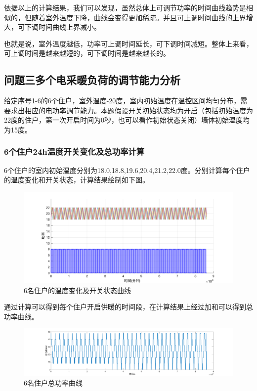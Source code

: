 \documentclass[withoutpreface,bwprint]{cumcmthesis} %
\begin{document}
依据以上的计算结果，我们可以发现，虽然总体上可调节功率的时间曲线趋势是相似的，但随着室外温度下降，曲线会变得更加稀疏。并且可上调时间曲线的上界增大，可下调时间曲线上界减小。

也就是说，室外温度越低，功率可上调时间延长，可下调时间减短。整体上来看，可上调时间是越来越短的，可下调时间是越来越长的。

\subsection{问题三\quad 多个电采暖负荷的调节能力分析}
给定序号1-6的6个住户，室外温度-20度，室内初始温度在温控区间均匀分布，需要求出相应的电功率调节能力。本题假设开关初始状态均为开启（包括初始温度为22度的住户，第一次开启时间为0秒，也可以看作初始状态关闭）墙体初始温度均为15度。
\subsubsection{6个住户24h温度开关变化及总功率计算}
6个住户的室内初始温度分别为18.0,18.8,19.6,20.4,21.2,22.0度。分别计算每个住户的温度变化和开关状态，计算结果绘制如下图。
\begin{figure}[H]
    \centering
        \includegraphics[width=1\textwidth]{figures/3-1.png}
    \caption{6名住户的温度变化及开关状态曲线}
    \label{fig:my_label}
    \end{figure}
    通过计算可以得到每个住户开启供暖的时间段，在计算结果上经过加和可以得到总功率曲线。
    \begin{figure}[H]
    \centering
        \includegraphics[width=1\textwidth]{figures/3-1-total.png}
    \caption{6名住户总功率曲线}
    \label{fig:my_label}
    \end{figure}
\end{document}
